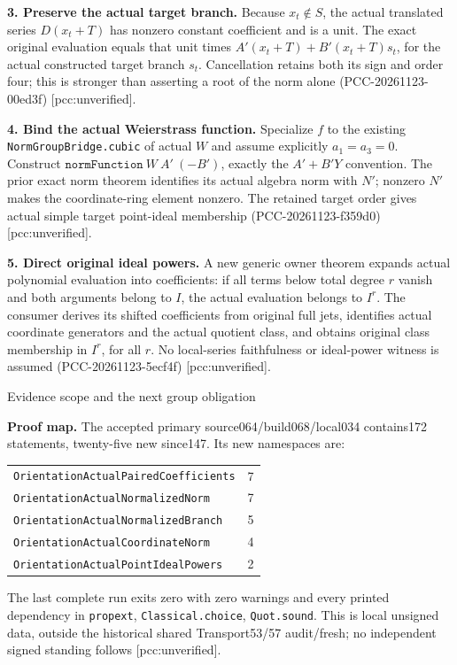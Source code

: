 \documentclass[11pt]{article}
\begin{document}
\textbf{3. Preserve the actual target branch.}
Because \(x_t\notin S\), the actual translated series \(D(x_t+T)\) has
nonzero constant coefficient and is a unit.
The exact original evaluation equals that unit times
\(A'(x_t+T)+B'(x_t+T)s_t\), for the actual constructed target branch \(s_t\).
Cancellation retains both its sign and order four; this is stronger than
asserting a root of the norm alone (PCC-20261123-00ed3f) [pcc:unverified].

\textbf{4. Bind the actual Weierstrass function.}
Specialize \(f\) to the existing \texttt{NormGroupBridge.cubic} of actual \(W\)
and assume explicitly \(a_1=a_3=0\).
Construct \(\texttt{normFunction}\ W\ A'\ (-B')\), exactly the
\(A'+B'Y\) convention. The prior exact norm theorem identifies its actual
algebra norm with \(N'\); nonzero \(N'\) makes the coordinate-ring element
nonzero. The retained target order gives actual simple target point-ideal
membership (PCC-20261123-f359d0) [pcc:unverified].

\textbf{5. Direct original ideal powers.}
A new generic owner theorem expands actual polynomial evaluation into
coefficients: if all terms below total degree \(r\) vanish and both arguments
belong to \(I\), the actual evaluation belongs to \(I^r\).
The consumer derives its shifted coefficients from original full jets,
identifies actual coordinate generators and the actual quotient class,
and obtains original class membership in \(I^r\), for all \(r\).
No local-series faithfulness or ideal-power witness is assumed
(PCC-20261123-5ecf4f) [pcc:unverified].

\newpage
\begin{center}{\Large Evidence scope and the next group obligation}\end{center}

\textbf{Proof map.}
The accepted primary source064/build068/local034 contains172 statements,
twenty-five new since147. Its new namespaces are:
\begin{center}
\begin{tabular}{lr}
\texttt{OrientationActualPairedCoefficients}&7\\
\texttt{OrientationActualNormalizedNorm}&7\\
\texttt{OrientationActualNormalizedBranch}&5\\
\texttt{OrientationActualCoordinateNorm}&4\\
\texttt{OrientationActualPointIdealPowers}&2
\end{tabular}
\end{center}
The last complete run exits zero with zero warnings and every printed
dependency in \texttt{propext}, \texttt{Classical.choice},
\texttt{Quot.sound}. This is local unsigned data, outside the historical
shared Transport53/57 audit/fresh; no independent signed standing follows
[pcc:unverified].
\end{document}
